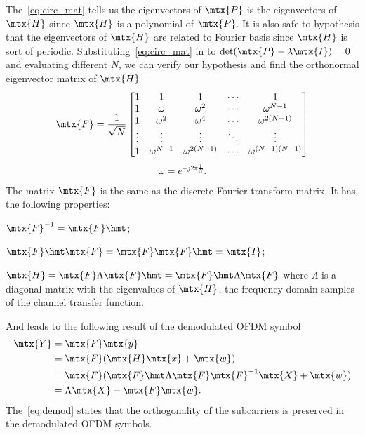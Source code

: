The~\cref{eq:circ_mat} tells us the eigenvectors of $\mtx{P}$ is the eigenvectors of $\mtx{H}$ since $\mtx{H}$ is a polynomial of $\mtx{P}$. It is also safe to hypothesis that the eigenvectors of $\mtx{H}$ are related to Fourier basis since $\mtx{H}$ is sort of periodic. Substituting~\cref{eq:circ_mat} in to $\det(\mtx{P}-\lambda\mtx{I})=0$ and evaluating different $N$, we can verify our hypothesis and find the orthonormal eigenvector matrix of $\mtx{H}$
\begin{equation}
    \mtx{F} = \frac{1}{\sqrt{N}}
    \begin{bmatrix}
        1 & 1 & 1 & \cdots & 1 \\
        1 & \omega & \omega^2 & \cdots & \omega^{N-1} \\
        1 & \omega^2 & \omega^4 & \cdots & \omega^{2(N-1)} \\
        \vdots & \vdots & \vdots & \ddots & \vdots \\
        1 & \omega^{N-1} & \omega^{2(N-1)} & \cdots & \omega^{(N-1)(N-1)}
    \end{bmatrix}
\end{equation}
\begin{equation}
    \omega = e^{-j2\pi\frac{1}{N}}.
\end{equation}

The matrix $\mtx{F}$ is the same as the discrete Fourier transform matrix. It has the following properties:
\begin{enumerate*}[(i)]
    \item $\mtx{F}\inv = \mtx{F}\hmt$;
    \item $\mtx{F}\hmt\mtx{F}=\mtx{F}\mtx{F}\hmt=\mtx{I}$;
    \item $\mtx{H}=\mtx{F}\Lambda\mtx{F}\hmt=\mtx{F}\hmt\Lambda\mtx{F}$ where $\Lambda$ is a diagonal matrix with the eigenvalues of $\mtx{H}$, \ie the frequency domain samples of the channel transfer function.
\end{enumerate*}
And leads to the following result of the demodulated OFDM symbol
\begin{equation}
    \label{eq:demod}
    \begin{aligned}
        \mtx{Y}
        &= \mtx{F}\mtx{y} \\
        &= \mtx{F}(\mtx{H}\mtx{x}+\mtx{w}) \\
        &= \mtx{F}(\mtx{F}\hmt\Lambda\mtx{F}\mtx{F}\inv\mtx{X}+\mtx{w}) \\
        &= \Lambda\mtx{X} + \mtx{F}\mtx{w}.
    \end{aligned}
\end{equation}
The~\cref{eq:demod} states that the orthogonality of the subcarriers is preserved in the demodulated OFDM symbols.


